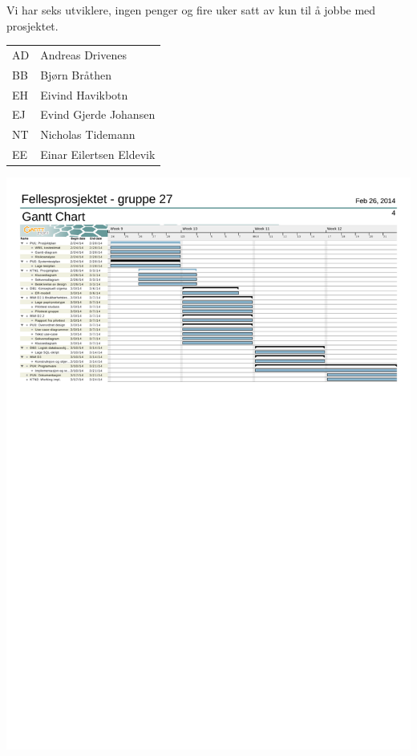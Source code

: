 
Vi har seks utviklere, ingen penger og fire uker satt av kun til å jobbe med prosjektet.



\begin{table}
 \centering
	\begin{tabular}{l l}
	AD & Andreas Drivenes\\
	BB & Bjørn Bråthen\\
	EH & Eivind Havikbotn\\
	EJ & Evind Gjerde Johansen\\
	NT & Nicholas Tidemann\\
	EE & Einar Eilertsen Eldevik\\
	\end{tabular}

\end{table}

\begin{landscape}
    \centering
      \includegraphics{gantt_tidsoversikt.pdf}%
 \end{landscape}